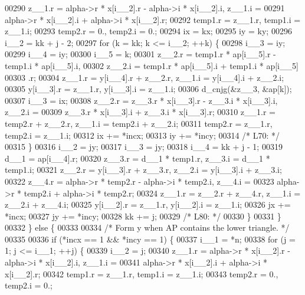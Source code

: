 \begin{DoxyCode}
00290         z\_\_1.r = alpha->r * x[i\_\_2].r - alpha->i * x[i\_\_2].i, z\_\_1.i =
00291              alpha->r * x[i\_\_2].i + alpha->i * x[i\_\_2].r;
00292         temp1.r = z\_\_1.r, temp1.i = z\_\_1.i;
00293         temp2.r = 0., temp2.i = 0.;
00294         ix = kx;
00295         iy = ky;
00296         i\_\_2 = kk + j - 2;
00297         \textcolor{keywordflow}{for} (k = kk; k <= i\_\_2; ++k) \{
00298             i\_\_3 = iy;
00299             i\_\_4 = iy;
00300             i\_\_5 = k;
00301             z\_\_2.r = temp1.r * ap[i\_\_5].r - temp1.i * ap[i\_\_5].i, 
00302                 z\_\_2.i = temp1.r * ap[i\_\_5].i + temp1.i * ap[i\_\_5]
00303                 .r;
00304             z\_\_1.r = y[i\_\_4].r + z\_\_2.r, z\_\_1.i = y[i\_\_4].i + z\_\_2.i;
00305             y[i\_\_3].r = z\_\_1.r, y[i\_\_3].i = z\_\_1.i;
00306             d\_cnjg(&z\_\_3, &ap[k]);
00307             i\_\_3 = ix;
00308             z\_\_2.r = z\_\_3.r * x[i\_\_3].r - z\_\_3.i * x[i\_\_3].i, z\_\_2.i =
00309                  z\_\_3.r * x[i\_\_3].i + z\_\_3.i * x[i\_\_3].r;
00310             z\_\_1.r = temp2.r + z\_\_2.r, z\_\_1.i = temp2.i + z\_\_2.i;
00311             temp2.r = z\_\_1.r, temp2.i = z\_\_1.i;
00312             ix += *incx;
00313             iy += *incy;
00314 \textcolor{comment}{/* L70: */}
00315         \}
00316         i\_\_2 = jy;
00317         i\_\_3 = jy;
00318         i\_\_4 = kk + j - 1;
00319         d\_\_1 = ap[i\_\_4].r;
00320         z\_\_3.r = d\_\_1 * temp1.r, z\_\_3.i = d\_\_1 * temp1.i;
00321         z\_\_2.r = y[i\_\_3].r + z\_\_3.r, z\_\_2.i = y[i\_\_3].i + z\_\_3.i;
00322         z\_\_4.r = alpha->r * temp2.r - alpha->i * temp2.i, z\_\_4.i = 
00323             alpha->r * temp2.i + alpha->i * temp2.r;
00324         z\_\_1.r = z\_\_2.r + z\_\_4.r, z\_\_1.i = z\_\_2.i + z\_\_4.i;
00325         y[i\_\_2].r = z\_\_1.r, y[i\_\_2].i = z\_\_1.i;
00326         jx += *incx;
00327         jy += *incy;
00328         kk += j;
00329 \textcolor{comment}{/* L80: */}
00330         \}
00331     \}
00332     \} \textcolor{keywordflow}{else} \{
00333 
00334 \textcolor{comment}{/*        Form  y  when AP contains the lower triangle. */}
00335 
00336     \textcolor{keywordflow}{if} (*incx == 1 && *incy == 1) \{
00337         i\_\_1 = *n;
00338         \textcolor{keywordflow}{for} (j = 1; j <= i\_\_1; ++j) \{
00339         i\_\_2 = j;
00340         z\_\_1.r = alpha->r * x[i\_\_2].r - alpha->i * x[i\_\_2].i, z\_\_1.i =
00341              alpha->r * x[i\_\_2].i + alpha->i * x[i\_\_2].r;
00342         temp1.r = z\_\_1.r, temp1.i = z\_\_1.i;
00343         temp2.r = 0., temp2.i = 0.;

\end{DoxyCode}
